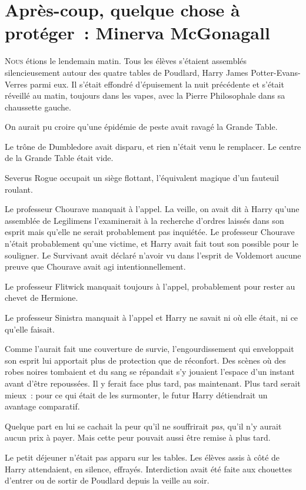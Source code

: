 \chapter{Après-coup, quelque chose à protéger~: Minerva McGonagall}

\lettrine{N}{ous} étions le lendemain matin. Tous les élèves s'étaient assemblés silencieusement autour des quatre tables de Poudlard, Harry James Potter-Evans-Verres parmi eux. Il s'était effondré d'épuisement la nuit précédente et s'était réveillé au matin, toujours dans les vapes, avec la Pierre Philosophale dans sa chaussette gauche.

On aurait pu croire qu'une épidémie de peste avait ravagé la Grande Table.

Le trône de Dumbledore avait disparu, et rien n'était venu le remplacer. Le centre de la Grande Table était vide.

Severus Rogue occupait un siège flottant, l'équivalent magique d'un fauteuil roulant.

Le professeur Chourave manquait à l'appel. La veille, on avait dit à Harry qu'une assemblée de Legilimens l'examinerait à la recherche d'ordres laissés dans son esprit mais qu'elle ne serait probablement pas inquiétée. Le professeur Chourave n'était probablement qu'une victime, et Harry avait fait tout son possible pour le souligner. Le Survivant avait déclaré n'avoir vu dans l'esprit de Voldemort aucune preuve que Chourave avait agi intentionnellement.

Le professeur Flitwick manquait toujours à l'appel, probablement pour rester au chevet de Hermione.

Le professeur Sinistra manquait à l'appel et Harry ne savait ni où elle était, ni ce qu'elle faisait.

Comme l'aurait fait une couverture de survie, l'engourdissement qui enveloppait son esprit lui apportait plus de protection que de réconfort. Des scènes où des robes noires tombaient et du sang se répandait s'y jouaient l'espace d'un instant avant d'être repoussées. Il y ferait face plus tard, pas maintenant. Plus tard serait mieux~: pour ce qui était de les surmonter, le futur Harry détiendrait un avantage comparatif.

Quelque part en lui se cachait la peur qu'il ne souffrirait \emph{pas}, qu'il n'y aurait aucun prix à payer. Mais cette peur pouvait aussi être remise à plus tard.

Le petit déjeuner n'était pas apparu sur les tables. Les élèves assis à côté de Harry attendaient, en silence, effrayés. Interdiction avait été faite aux chouettes d'entrer ou de sortir de Poudlard depuis la veille au soir.

